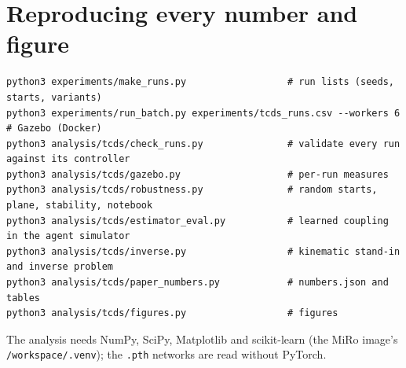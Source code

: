 \documentclass[10pt,a4paper]{article}
\begin{document}
\section{Reproducing every number and figure}
\small
\begin{verbatim}
python3 experiments/make_runs.py                  # run lists (seeds, starts, variants)
python3 experiments/run_batch.py experiments/tcds_runs.csv --workers 6   # Gazebo (Docker)
python3 analysis/tcds/check_runs.py               # validate every run against its controller
python3 analysis/tcds/gazebo.py                   # per-run measures
python3 analysis/tcds/robustness.py               # random starts, plane, stability, notebook
python3 analysis/tcds/estimator_eval.py           # learned coupling in the agent simulator
python3 analysis/tcds/inverse.py                  # kinematic stand-in and inverse problem
python3 analysis/tcds/paper_numbers.py            # numbers.json and tables
python3 analysis/tcds/figures.py                  # figures
\end{verbatim}
\normalsize
The analysis needs NumPy, SciPy, Matplotlib and scikit-learn (the MiRo image's \texttt{/workspace/.venv}); the \texttt{.pth} networks are read without PyTorch.
\end{document}
